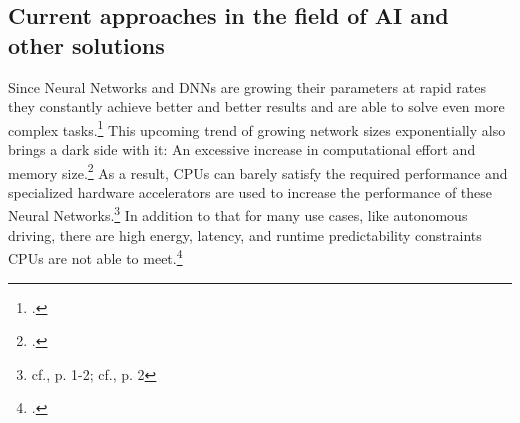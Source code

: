 \subsection{Current approaches in the field of AI and other solutions}
Since Neural Networks and \ac{DNN}s are growing their parameters at rapid rates they constantly achieve better and better results and are able to solve even more complex tasks.\footcite[cf.][1]{baischerLearningHardwareTutorial2021}
This upcoming trend of growing network sizes exponentially also brings a dark side with it: An excessive increase in computational effort and memory size.\footcite[cf.][1-2]{baischerLearningHardwareTutorial2021}
As a result, \ac{CPU}s can barely satisfy the required performance and specialized hardware accelerators are used to increase the performance of these Neural Networks.\footnote{cf.\cite{zhouPhotonicMatrixMultiplication2022}, p. 1-2; cf.\cite{baischerLearningHardwareTutorial2021}, p. 2}
In addition to that for many use cases, like autonomous driving, there are high energy, latency, and runtime predictability constraints \ac{CPU}s are not able to meet.\footcite[cf.][2692]{ahmadOptimizingHardwareAccelerated2020}

